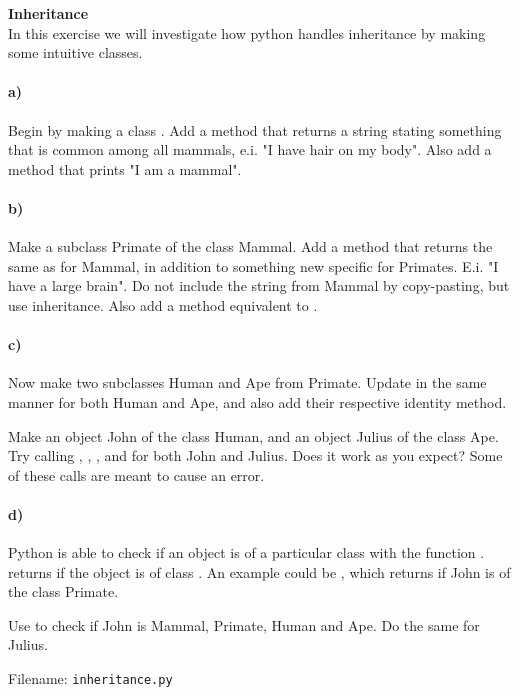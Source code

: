\begin{Problem}{\textbf{Inheritance}} \label{prob94}
\\
In this exercise we will investigate how python handles inheritance by making some intuitive classes. 

\paragraph{a)}
Begin by making a class . Add a method  that returns a string stating something that is common among all mammals, e.i. "I have hair on my body". Also add a method  that prints "I am a mammal".

\paragraph{b)}
Make a subclass Primate of the class Mammal. Add a method  that returns the same as  for Mammal, in addition to something new specific for Primates. E.i. "I have a large brain". Do not include the string from Mammal by copy-pasting, but use inheritance. Also add a method
 equivalent to .

\paragraph{c)}
Now make two subclasses Human and Ape from Primate. Update  in the same manner for both Human and Ape, and also add their respective identity method.


Make an object John of the class Human, and an object Julius of the class Ape. Try calling , ,   ,   and  for both John and Julius. Does it work as you expect? Some of these calls are meant to cause an error. 
\paragraph{d)}
Python is able to check if an object is of a particular class with the function . 
 returns  if the object  is of class . An example could be   
, which returns  if John is of the class Primate.


Use  to check if John is Mammal, Primate, Human and Ape. Do the same for Julius.

Filename: \texttt{inheritance.py}
\end{Problem}